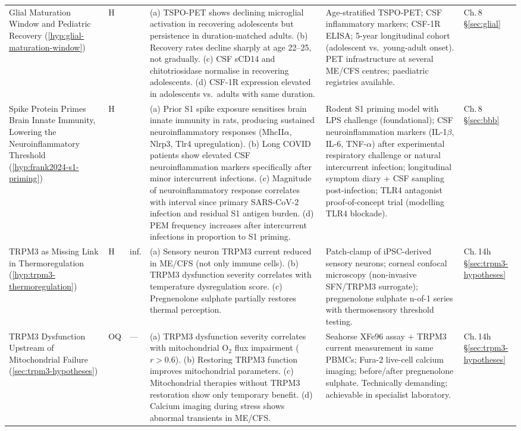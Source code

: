 \begin{longtable}{%
  p{3.0cm}
  >{\centering\arraybackslash}p{0.55cm}
  >{\centering\arraybackslash}p{1.0cm}
  p{3.8cm}
  p{3.8cm}
  p{2.2cm}
}
Glial Maturation Window and Pediatric Recovery
(\ref{hyp:glial-maturation-window})
&
H & 0.45
&
(a) TSPO-PET shows declining microglial activation in recovering adolescents
but persistence in duration-matched adults.
(b) Recovery rates decline sharply at age 22--25, not gradually.
(c) CSF sCD14 and chitotriosidase normalise in recovering adolescents.
(d) CSF-1R expression elevated in adolescents vs.\ adults with same duration.
&
Age-stratified TSPO-PET; CSF inflammatory markers; CSF-1R ELISA;
5-year longitudinal cohort (adolescent vs.\ young-adult onset).
PET infrastructure at several ME/CFS centres; paediatric registries available.
&
Ch.\,8 \S\ref{sec:glial} \\[6pt]

Spike Protein Primes Brain Innate Immunity, Lowering the Neuroinflammatory Threshold
(\ref{hyp:frank2024-s1-priming})
&
H & 0.55
&
(a) Prior S1 spike exposure sensitises brain innate immunity in rats,
producing sustained neuroinflammatory responses (MhcII$\alpha$, Nlrp3, Tlr4 upregulation).
(b) Long COVID patients show elevated CSF neuroinflammation markers specifically
after minor intercurrent infections.
(c) Magnitude of neuroinflammatory response correlates with interval since primary
SARS-CoV-2 infection and residual S1 antigen burden.
(d) PEM frequency increases after intercurrent infections in proportion to S1 priming.
&
Rodent S1 priming model with LPS challenge (foundational);
CSF neuroinflammation markers (IL-1$\beta$, IL-6, TNF-$\alpha$) after experimental
respiratory challenge or natural intercurrent infection;
longitudinal symptom diary + CSF sampling post-infection;
TLR4 antagonist proof-of-concept trial (modelling TLR4 blockade).
&
Ch.\,8 \S\ref{sec:bbb} \\[6pt]

TRPM3 as Missing Link in Thermoregulation
(\ref{hyp:trpm3-thermoregulation})
&
H & inf.
&
(a) Sensory neuron TRPM3 current reduced in ME/CFS (not only immune cells).
(b) TRPM3 dysfunction severity correlates with temperature dysregulation score.
(c) Pregnenolone sulphate partially restores thermal perception.
&
Patch-clamp of iPSC-derived sensory neurons;
corneal confocal microscopy (non-invasive SFN/TRPM3 surrogate);
pregnenolone sulphate n-of-1 series with thermosensory threshold testing.
&
Ch.\,14h \S\ref{sec:trpm3-hypotheses} \\[6pt]

TRPM3 Dysfunction Upstream of Mitochondrial Failure
(\ref{sec:trpm3-hypotheses})
&
OQ & ---
&
(a) TRPM3 dysfunction severity correlates with mitochondrial O$_2$ flux
impairment ($r > 0.6$).
(b) Restoring TRPM3 function improves mitochondrial parameters.
(c) Mitochondrial therapies without TRPM3 restoration show only temporary benefit.
(d) Calcium imaging during stress shows abnormal transients in ME/CFS.
&
Seahorse XFe96 assay + TRPM3 current measurement in same PBMCs;
Fura-2 live-cell calcium imaging;
before/after pregnenolone sulphate.
Technically demanding; achievable in specialist laboratory.
&
Ch.\,14h \S\ref{sec:trpm3-hypotheses} \\[6pt]


\end{longtable}

